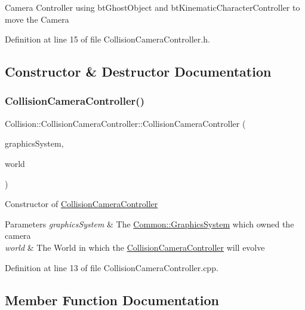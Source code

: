 Camera Controller using bt\+Ghost\+Object and bt\+Kinematic\+Character\+Controller to move the Camera 

Definition at line 15 of file Collision\+Camera\+Controller.\+h.



\subsection{Constructor \& Destructor Documentation}
\mbox{\label{class_collision_1_1_collision_camera_controller_ac22915566c34afa0c50400e26dcb667b}} 
\subsubsection{\texorpdfstring{Collision\+Camera\+Controller()}{CollisionCameraController()}}
{\footnotesize\ttfamily Collision\+::\+Collision\+Camera\+Controller\+::\+Collision\+Camera\+Controller (\begin{DoxyParamCaption}\item[{\hyperlink{class_common_1_1_graphics_system}{Common\+::\+Graphics\+System} $\ast$}]{graphics\+System,  }\item[{bt\+Dynamics\+World $\ast$}]{world }\end{DoxyParamCaption})}

Constructor of \hyperlink{class_collision_1_1_collision_camera_controller}{Collision\+Camera\+Controller} 
\begin{DoxyParams}{Parameters}
{\em graphics\+System} & The \hyperlink{class_common_1_1_graphics_system}{Common\+::\+Graphics\+System} which owned the camera \\
\hline
{\em world} & The World in which the \hyperlink{class_collision_1_1_collision_camera_controller}{Collision\+Camera\+Controller} will evolve \\
\hline
\end{DoxyParams}


Definition at line 13 of file Collision\+Camera\+Controller.\+cpp.



\subsection{Member Function Documentation}
\mbox{\label{class_collision_1_1_collision_camera_controller_ac25037b29b022a2ccf77b16fe0bda670}} 
